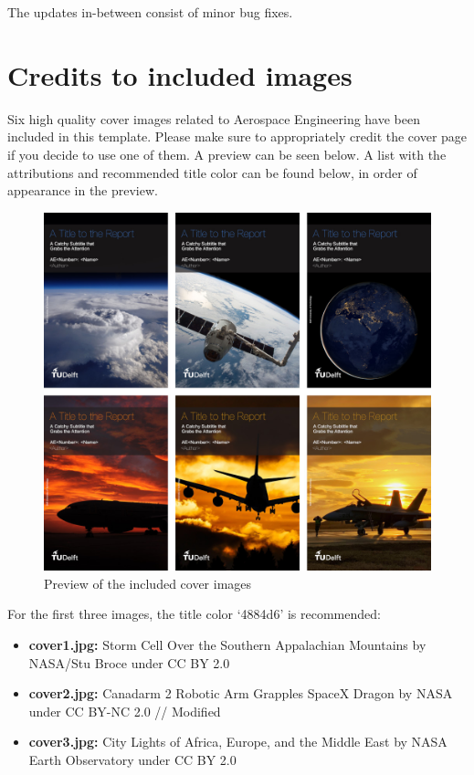 \noindent The updates in-between consist of minor bug fixes.

\newpage
\section{Credits to included images}

Six high quality cover images related to Aerospace Engineering have been included in this template. Please make sure to appropriately credit the cover page if you decide to use one of them. A preview can be seen below. A list with the attributions and recommended title color can be found below, in order of appearance in the preview.

\begin{figure}[h]
    \centering
    \includegraphics[width=0.75\linewidth]{layout/covers/Covers.jpg}
    \caption{Preview of the included cover images}
\end{figure}

\noindent For the first three images, the title color `4884d6' is recommended:

\begin{itemize}
    \item \textbf{cover1.jpg:} Storm Cell Over the Southern Appalachian Mountains by NASA/Stu Broce under CC BY 2.0
    \item \textbf{cover2.jpg:} Canadarm 2 Robotic Arm Grapples SpaceX Dragon by NASA under CC BY-NC 2.0 // Modified
    \item \textbf{cover3.jpg:} City Lights of Africa, Europe, and the Middle East by NASA Earth Observatory under CC BY 2.0
\end{itemize}

